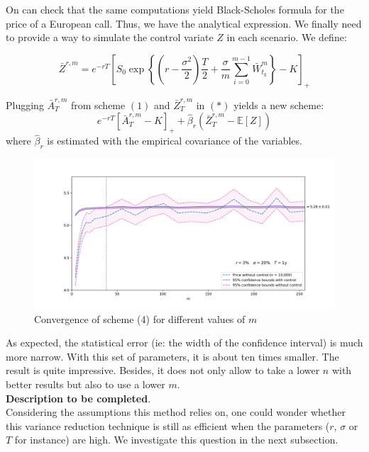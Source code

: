 \documentclass{article}
\begin{document}
On can check that the same computations yield Black-Scholes formula for the price of a European call.
Thus, we have the analytical expression. We finally need to provide a way to simulate the control variate $Z$
in each scenario. We define:

\begin{equation}
	\bar Z^{r, m} = e^{-rT} \left[ S_0 \exp \left\{ \left( r - \frac{\sigma^2}{2} \right) \frac{T}{2} +
		\frac{\sigma}{m} \sum_{i=0}^{m-1} \bar W_{t_k}^m \right\} - K \right]_+
	\tag{$i$}
\end{equation}

Plugging $\bar A_T^{r, m}$ from scheme $(1)$ and $\bar Z_T^{r, m}$ in $(\ast)$ yields a new scheme:
\begin{equation}
	e^{-rT} \left[ \bar A_T^{r, m} - K \right]_+ + \hat\beta_r \left( \bar Z_T^{r, m} - \mathbb E [Z] \right)
	\tag{4}
\end{equation}
where $\hat\beta_r$ is estimated with the empirical covariance of the variables.

\begin{figure}[H]
  \hspace*{-0.1\linewidth}\includegraphics[width=1.1\textwidth]{charts/cvgce_control.png}
  \caption{Convergence of scheme (4) for different values of $m$}
\end{figure}

As expected, the statistical error (ie: the width of the confidence interval) is much more narrow. With this set of
parameters, it is about ten times smaller. The result is quite impressive. Besides, it does not only allow to take
a lower $n$ with better results but also to use a lower $m$.\\
\textbf{Description to be completed}.\\
Considering the assumptions this method relies on, one could wonder whether this variance reduction technique
is still as efficient when the parameters ($r$, $\sigma$ or $T$ for instance) are high. We investigate this question
in the next subsection.
\end{document}
